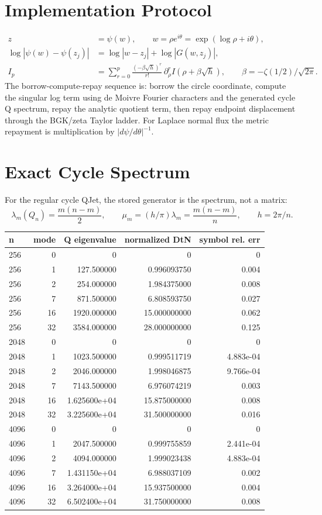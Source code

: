 \documentclass[10pt]{article}
\begin{document}
\section{Implementation Protocol}
\begin{align*}
z &= \psi(w), \qquad w = \rho e^{i\theta} = \exp(\log \rho + i\theta),\\
\log|\psi(w)-\psi(z_j)| &= \log|w-z_j| + \log|G(w,z_j)|,\\
I_p &= \sum_{r=0}^{p}\frac{(-\beta\sqrt{h})^r}{r!}\,\partial_\rho^r I(\rho+\beta\sqrt{h}),
\qquad \beta=-\zeta(1/2)/\sqrt{2\pi}.
\end{align*}
The borrow-compute-repay sequence is: borrow the circle coordinate, compute the singular log term using de Moivre Fourier characters and the generated cycle Q spectrum, repay the analytic quotient term, then repay endpoint displacement through the BGK/zeta Taylor ladder.  For Laplace normal flux the metric repayment is multiplication by $|d\psi/d\theta|^{-1}$.
\section{Exact Cycle Spectrum}
For the regular cycle QJet, the stored generator is the spectrum, not a matrix:
\[
\lambda_m(Q_n)=\frac{m(n-m)}{2},\qquad \mu_m=(h/\pi)\lambda_m=\frac{m(n-m)}{n},\qquad h=2\pi/n.
\]
\begin{tabular}{lrrrr}
\toprule
n & mode & Q eigenvalue & normalized DtN & symbol rel. err \\
\midrule
256 & 0 & 0 & 0 & 0 \\
256 & 1 & 127.500000 & 0.996093750 & 0.004 \\
256 & 2 & 254.000000 & 1.984375000 & 0.008 \\
256 & 7 & 871.500000 & 6.808593750 & 0.027 \\
256 & 16 & 1920.000000 & 15.000000000 & 0.062 \\
256 & 32 & 3584.000000 & 28.000000000 & 0.125 \\
2048 & 0 & 0 & 0 & 0 \\
2048 & 1 & 1023.500000 & 0.999511719 & 4.883e-04 \\
2048 & 2 & 2046.000000 & 1.998046875 & 9.766e-04 \\
2048 & 7 & 7143.500000 & 6.976074219 & 0.003 \\
2048 & 16 & 1.625600e+04 & 15.875000000 & 0.008 \\
2048 & 32 & 3.225600e+04 & 31.500000000 & 0.016 \\
4096 & 0 & 0 & 0 & 0 \\
4096 & 1 & 2047.500000 & 0.999755859 & 2.441e-04 \\
4096 & 2 & 4094.000000 & 1.999023438 & 4.883e-04 \\
4096 & 7 & 1.431150e+04 & 6.988037109 & 0.002 \\
4096 & 16 & 3.264000e+04 & 15.937500000 & 0.004 \\
4096 & 32 & 6.502400e+04 & 31.750000000 & 0.008 \\
\bottomrule
\end{tabular}
\end{document}
